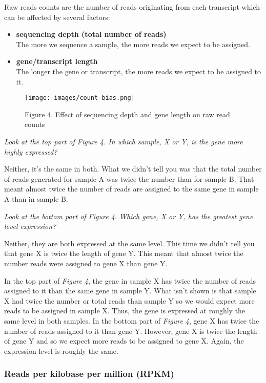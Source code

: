 \documentclass[11pt]{article}
\begin{document}
Raw reads counts are the number of reads originating from each
transcript which can be affected by several factors:

\begin{itemize}
\item
  \textbf{sequencing depth (total number of reads)}\\
  The more we sequence a sample, the more reads we expect to be
  assigned.
\item
  \textbf{gene/transcript length}\\
  The longer the gene or transcript, the more reads we expect to be
  assigned to it.
\end{itemize}

    \begin{figure}[!h]
\centering
\texttt{[image: images/count-bias.png]}
\caption{Figure 4. Effect of sequencing depth and gene length on raw
read counts}
\end{figure}

\newpage

    \textit{Look at the top part of Figure 4. In which sample, X or Y, is the
gene more highly expressed?}

Neither, it's the same in both. What we didn't tell you was that the
total number of reads generated for sample A was twice the number than
for sample B. That meant almost twice the number of reads are assigned
to the same gene in sample A than in sample B.

\textit{Look at the bottom part of Figure 4. Which gene, X or Y, has the
greatest gene level expression?}

Neither, they are both expressed at the same level. This time we didn't
tell you that gene X is twice the length of gene Y. This meant that
almost twice the number reads were assigned to gene X than gene Y.

In the top part of \textit{Figure 4}, the gene in sample X has twice the
number of reads assigned to it than the same gene in sample Y. What
isn't shown is that sample X had twice the number or total reads than
sample Y so we would expect more reads to be assigned in sample X. Thus,
the gene is expressed at roughly the same level in both samples. In the
bottom part of \textit{Figure 4}, gene X has twice the number of reads
assigned to it than gene Y. However, gene X is twice the length of gene
Y and so we expect more reads to be assigned to gene X. Again, the
expression level is roughly the same.

    \hypertarget{reads-per-kilobase-per-million-rpkm}{%
\subsubsection{Reads per kilobase per million
(RPKM)}\label{reads-per-kilobase-per-million-rpkm}}
\end{document}
